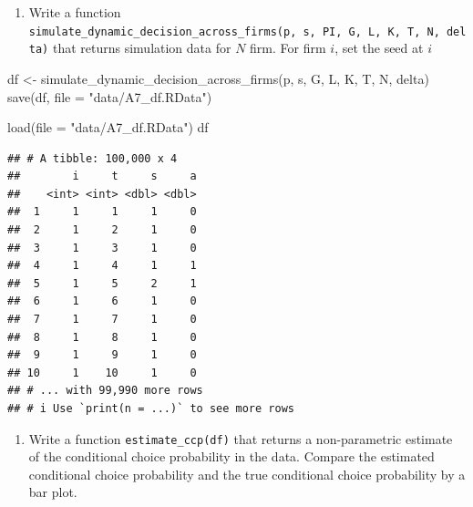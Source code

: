 \documentclass[
]{book}
\newenvironment{Shaded}{\begin{snugshade}}{\end{snugshade}}
\newcommand{\AttributeTok}[1]{\textcolor[rgb]{0.77,0.63,0.00}{#1}}
\newcommand{\FunctionTok}[1]{\textcolor[rgb]{0.00,0.00,0.00}{#1}}
\newcommand{\NormalTok}[1]{#1}
\newcommand{\OtherTok}[1]{\textcolor[rgb]{0.56,0.35,0.01}{#1}}
\newcommand{\StringTok}[1]{\textcolor[rgb]{0.31,0.60,0.02}{#1}}
\providecommand{\tightlist}{%
  \setlength{\itemsep}{0pt}\setlength{\parskip}{0pt}}
\begin{document}
\begin{enumerate}
\def\labelenumi{\arabic{enumi}.}
\setcounter{enumi}{6}
\tightlist
\item
  Write a function \texttt{simulate\_dynamic\_decision\_across\_firms(p,\ s,\ PI,\ G,\ L,\ K,\ T,\ N,\ delta)} that returns simulation data for \(N\) firm. For firm \(i\), set the seed at \(i\)
\end{enumerate}

\begin{Shaded}
\begin{Highlighting}[]
\NormalTok{df }\OtherTok{\textless{}{-}} \FunctionTok{simulate\_dynamic\_decision\_across\_firms}\NormalTok{(p, s,  G, L, K, T, N, delta)}
\FunctionTok{save}\NormalTok{(df, }\AttributeTok{file =} \StringTok{"data/A7\_df.RData"}\NormalTok{)}
\end{Highlighting}
\end{Shaded}

\begin{Shaded}
\begin{Highlighting}[]
\FunctionTok{load}\NormalTok{(}\AttributeTok{file =} \StringTok{"data/A7\_df.RData"}\NormalTok{)}
\NormalTok{df}
\end{Highlighting}
\end{Shaded}

\begin{verbatim}
## # A tibble: 100,000 x 4
##        i     t     s     a
##    <int> <int> <dbl> <dbl>
##  1     1     1     1     0
##  2     1     2     1     0
##  3     1     3     1     0
##  4     1     4     1     1
##  5     1     5     2     1
##  6     1     6     1     0
##  7     1     7     1     0
##  8     1     8     1     0
##  9     1     9     1     0
## 10     1    10     1     0
## # ... with 99,990 more rows
## # i Use `print(n = ...)` to see more rows
\end{verbatim}

\begin{enumerate}
\def\labelenumi{\arabic{enumi}.}
\setcounter{enumi}{7}
\tightlist
\item
  Write a function \texttt{estimate\_ccp(df)} that returns a non-parametric estimate of the conditional choice probability in the data. Compare the estimated conditional choice probability and the true conditional choice probability by a bar plot.
\end{enumerate}
\end{document}

